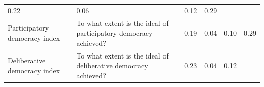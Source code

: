 \documentclass[]{report}
\theoremstyle{definition}
\theoremstyle{definition}
\theoremstyle{definition}
\theoremstyle{remark}
\begin{document}
\begin{longtable}[]{@{}llrrrr@{}}
\begin{minipage}[t]{0.03\columnwidth}
0.22\strut
\end{minipage} & \begin{minipage}[t]{0.08\columnwidth}\raggedleft\strut
0.06\strut
\end{minipage} & \begin{minipage}[t]{0.08\columnwidth}\raggedleft\strut
0.12\strut
\end{minipage} & \begin{minipage}[t]{0.08\columnwidth}\raggedleft\strut
0.29\strut
\end{minipage}\tabularnewline
\begin{minipage}[t]{0.16\columnwidth}\raggedright\strut
Participatory democracy index\strut
\end{minipage} & \begin{minipage}[t]{0.42\columnwidth}\raggedright\strut
To what extent is the ideal of participatory democracy achieved?\strut
\end{minipage} & \begin{minipage}[t]{0.03\columnwidth}\raggedleft\strut
0.19\strut
\end{minipage} & \begin{minipage}[t]{0.08\columnwidth}\raggedleft\strut
0.04\strut
\end{minipage} & \begin{minipage}[t]{0.08\columnwidth}\raggedleft\strut
0.10\strut
\end{minipage} & \begin{minipage}[t]{0.08\columnwidth}\raggedleft\strut
0.29\strut
\end{minipage}\tabularnewline
\begin{minipage}[t]{0.16\columnwidth}\raggedright\strut
Deliberative democracy index\strut
\end{minipage} & \begin{minipage}[t]{0.42\columnwidth}\raggedright\strut
To what extent is the ideal of deliberative democracy achieved?\strut
\end{minipage} & \begin{minipage}[t]{0.03\columnwidth}\raggedleft\strut
0.23\strut
\end{minipage} & \begin{minipage}[t]{0.08\columnwidth}\raggedleft\strut
0.04\strut
\end{minipage} & \begin{minipage}[t]{0.08\columnwidth}\raggedleft\strut
0.12\strut
\end{minipage} & \begin{minipage}[t]{0.08\columnwidth}\raggedleft\strut

\end{minipage}
\end{longtable}
\end{document}
